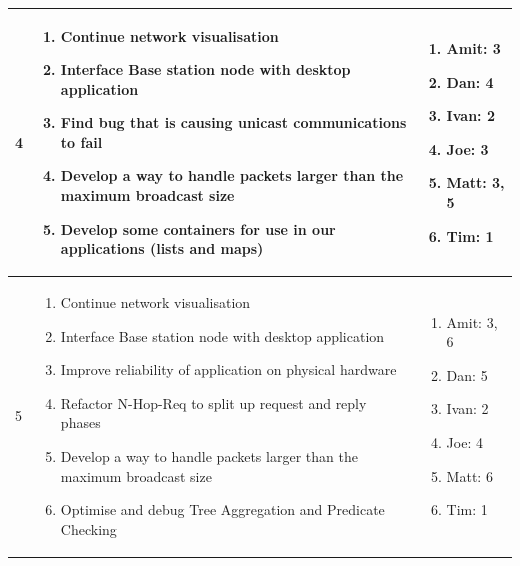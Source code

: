 \begin{center}
\begin{longtable}{| l | p{7.5cm} | p{5cm} |}
	4 & \begin{enumerate}
		\item Continue network visualisation
		\item Interface Base station node with desktop application
		\item Find bug that is causing unicast communications to fail
		\item Develop a way to handle packets larger than the maximum broadcast size
		\item Develop some containers for use in our applications (lists and maps)
		\end{enumerate} &
	\begin{enumerate}
		\item[] Amit: 3
		\item[] Dan: 4
		\item[] Ivan: 2
		\item[] Joe: 3
		\item[] Matt: 3, 5
		\item[] Tim: 1
	\end{enumerate}
	\\ \hline

	5 & \begin{enumerate}
		\item Continue network visualisation
		\item Interface Base station node with desktop application
		\item Improve reliability of application on physical hardware
		\item Refactor N-Hop-Req to split up request and reply phases
		\item Develop a way to handle packets larger than the maximum broadcast size
		\item Optimise and debug Tree Aggregation and Predicate Checking
		\end{enumerate} &
	\begin{enumerate}
		\item[] Amit: 3, 6
		\item[] Dan: 5
		\item[] Ivan: 2
		\item[] Joe: 4
		\item[] Matt: 6
		\item[] Tim: 1
	\end{enumerate}
	\\ \hline


\end{longtable}
\end{center}
